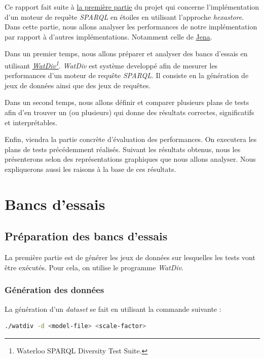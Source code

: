 \documentclass[12pt,titlepage]{article}
\begin{document}
Ce rapport fait suite à \href{https://github.com/chakibreds/mtq\_moteur\_sparql}{la première partie} du projet qui concerne l'implémentation d'un moteur de requête \textit{SPARQL} en étoiles en utilisant l'approche \textit{hexastore}. Dans cette partie, nous allons analyser les performances de notre implémentation par rapport à d'autres implémentations. Notamment celle de \href{https://fr.wikipedia.org/wiki/Jena\_(framework)}{Jena}.

Dans un premier temps, nous allons préparer et analyser des bancs d'essais en utilisant \textit{\href{https://dsg.uwaterloo.ca/watdiv/}{WatDiv}\footnote{Waterloo SPARQL Diversity Test Suite.}}. \textit{WatDiv} est système developpé afin de mesurer les performances d'un moteur de requête \textit{SPARQL}. Il consiste en la génération de jeux de données ainsi que des jeux de requêtes.

Dans un second temps, nous allons définir et comparer plusieurs plans de tests afin d'en trouver un (ou plusieurs) qui donne des résultats correctes, significatifs et interprétables.

Enfin, viendra la partie concrète d'évaluation des performances. On executera les plans de tests précédemment réalisés. Suivant les résultats obtenus, nous les présenterons selon des représentations graphiques que nous allons analyser. Nous expliquerons aussi les raisons à la base de ces résultats.

\section{Bancs d'essais}

\subsection{Préparation des bancs d'essais}

La première partie est de générer les jeux de données sur lesquelles les tests vont être exécutés. Pour cela, on utilise le programme \textit{WatDiv}.

\subsubsection{Génération des données}

La génération d'un \textit{dataset} se fait en utilisant la commande suivante :

\begin{lstlisting}[language=bash,caption=Commande pour la création  d'un dataset]
  ./watdiv -d <model-file> <scale-factor>
\end{lstlisting}
\end{document}

